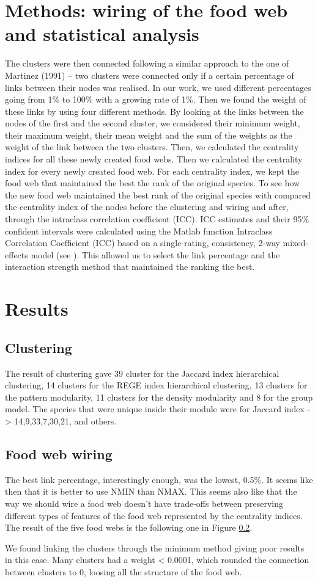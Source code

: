 \documentclass[twocolumn]{article}
\begin{document}
\section*{Methods: wiring of the food web and statistical analysis}
    The clusters were then connected following a similar approach to the one of Martinez (1991) – two clusters were connected only if a certain percentage of links between their nodes was realised. In our work, we used different percentages going from 1\% to 100\% with a growing rate of 1\%.  Then we found the weight of these links by using four different methods. By looking at the links between the nodes of the first and the second cluster, we considered their minimum weight, their maximum weight, their mean weight and the sum of the weights as the weight of the link between the two clusters. Then, we calculated the centrality indices for all these newly created food webs. Then we calculated the centrality index for every newly created food web. For each centrality index, we kept the food web that maintained the best the rank of the original species. To see how the new food web maintained the best rank of the original species with compared the centrality index of the nodes before the clustering and wiring and after, through the intraclass correlation coefficient (ICC). ICC estimates and their 95\% confident intervals were calculated using the Matlab function Intraclass Correlation Coefficient (ICC) \citep{Salarian2021} based on a single-rating, consistency, 2-way mixed-effects model (see \citet{McGraw1996}). This allowed us to select the link percentage and the interaction strength method that maintained the ranking the best.
\section*{Results}
    \subsection{Clustering}
        The result of clustering gave 39 cluster for the Jaccard index hierarchical clustering, 14 clusters for the REGE index hierarchical clustering, 13 clusters for the pattern modularity, 11 clusters for the density modularity and 8 for the group model.
        The species that were unique inside their module were for Jaccard index -> 14,9,33,7,30,21, and others.
    \subsection{Food web wiring}
        The best link percentage, interestingly enough, was the lowest, 0.5\%. It seems like then that it is better to use NMIN than NMAX. This seems also like that the way we should wire a food web doesn't have trade-offs between preserving different types of features of the food web represented by the centrality indices. The result of the five food webs is the following one in Figure \ref{}. 
        \par We found linking the clusters through the minimum method giving poor results in this case. Many clusters had a weight < 0.0001, which rounded the connection between clusters to 0, loosing all the structure of the food web.  
\end{document}
